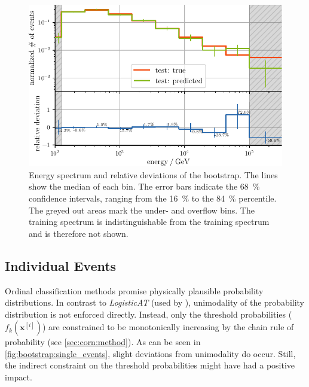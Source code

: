\begin{figure}
  \centering
  \includegraphics[scale=1]{content/plots/bootstrap:spectrum_full.pdf}
  \caption{
    Energy spectrum and relative deviations of the bootstrap.
    The lines show the median of each bin.
    The error bars indicate the \SI{68}{\percent} confidence intervals,
    ranging from the \SI{16}{\percent} to the \SI{84}{\percent} percentile.
    The greyed out areas mark the under- and overflow bins.
    The training spectrum is indistinguishable from the training spectrum
      and is therefore not shown.
  }
  \label{fig:bootstrap:spectrum}
\end{figure}


\subsection{Individual Events}
Ordinal classification methods promise physically plausible probability distributions.
In contrast to \emph{LogisticAT}
    (used by \citeauthor{dsea_jan} \cite{dsea_jan}),
  unimodality of the probability distribution is not enforced directly.
Instead,
  only the threshold probabilities ($f_k(\mathbf{x}^{[i]})$) are constrained to be monotonically increasing
    by the chain rule of probability
  (see \autoref{sec:corn:method}).
As can be seen in \autoref{fig:bootstrap:single_events},
  slight deviations from unimodality do occur.
Still,
  the indirect constraint on the threshold probabilities
  might have had a positive impact.

